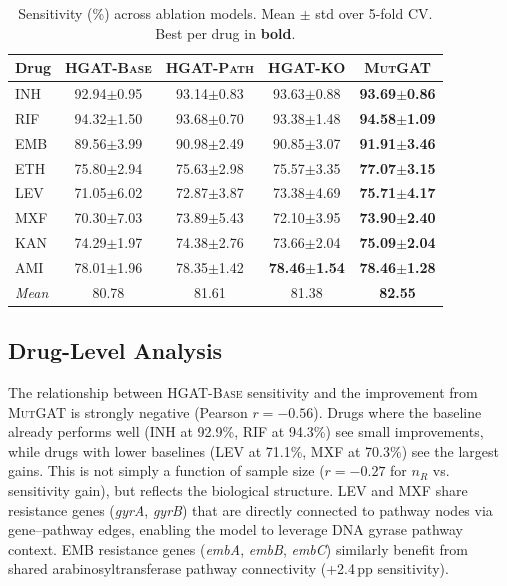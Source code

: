 \documentclass{article}
\theoremstyle{plain}
\theoremstyle{definition}
\theoremstyle{remark}
\begin{document}
\begin{table}[t]
\caption{Sensitivity (\%) across ablation models. Mean $\pm$ std over 5-fold CV. Best per drug in \textbf{bold}.}
\label{tab:sensitivity}
\vskip 0.1in
\begin{center}
\begin{small}
\begin{tabular}{lcccc}
\toprule
Drug & \textsc{HGAT-Base} & \textsc{HGAT-Path} & \textsc{HGAT-KO} & \textsc{MutGAT} \\
\midrule
INH & 92.94$\pm$0.95 & 93.14$\pm$0.83 & 93.63$\pm$0.88 & \textbf{93.69$\pm$0.86} \\
RIF & 94.32$\pm$1.50 & 93.68$\pm$0.70 & 93.38$\pm$1.48 & \textbf{94.58$\pm$1.09} \\
EMB & 89.56$\pm$3.99 & 90.98$\pm$2.49 & 90.85$\pm$3.07 & \textbf{91.91$\pm$3.46} \\
ETH & 75.80$\pm$2.94 & 75.63$\pm$2.98 & 75.57$\pm$3.35 & \textbf{77.07$\pm$3.15} \\
\midrule
LEV & 71.05$\pm$6.02 & 72.87$\pm$3.87 & 73.38$\pm$4.69 & \textbf{75.71$\pm$4.17} \\
MXF & 70.30$\pm$7.03 & 73.89$\pm$5.43 & 72.10$\pm$3.95 & \textbf{73.90$\pm$2.40} \\
KAN & 74.29$\pm$1.97 & 74.38$\pm$2.76 & 73.66$\pm$2.04 & \textbf{75.09$\pm$2.04} \\
AMI & 78.01$\pm$1.96 & 78.35$\pm$1.42 & \textbf{78.46$\pm$1.54} & \textbf{78.46$\pm$1.28} \\
\midrule
\textit{Mean} & 80.78 & 81.61 & 81.38 & \textbf{82.55} \\
\bottomrule
\end{tabular}
\end{small}
\end{center}
\end{table}

\subsection{Drug-Level Analysis}

The relationship between \textsc{HGAT-Base} sensitivity and the improvement from \textsc{MutGAT} is strongly negative (Pearson $r = -0.56$). Drugs where the baseline already performs well (INH at 92.9\%, RIF at 94.3\%) see small improvements, while drugs with lower baselines (LEV at 71.1\%, MXF at 70.3\%) see the largest gains. This is not simply a function of sample size ($r = -0.27$ for $n_R$ vs. sensitivity gain), but reflects the biological structure. LEV and MXF share resistance genes (\textit{gyrA}, \textit{gyrB}) that are directly connected to pathway nodes via gene--pathway edges, enabling the model to leverage DNA gyrase pathway context. EMB resistance genes (\textit{embA}, \textit{embB}, \textit{embC}) similarly benefit from shared arabinosyltransferase pathway connectivity (+2.4\,pp sensitivity).
\end{document}
